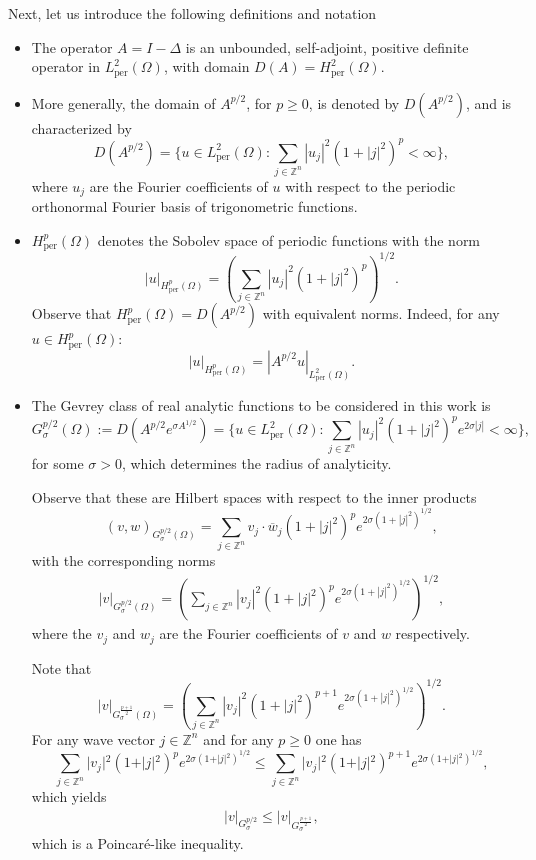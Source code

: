 \documentclass[12pt]{article}
\theoremstyle{plain}
\theoremstyle{remark}
\newcommand{\Hper}{H_{\mathrm{per}}}
\begin{document}
Next, let us introduce the following definitions and notation 
\begin{itemize}
\item  The operator $A=I-\Delta $ is an unbounded, self-adjoint, positive definite operator in $L_\text{per}^2(\Omega)$, with domain $D(A)=H_\text{per}^2(\Omega)$.
    
\item More generally, the domain of $A^{p/2}$, for $p\ge0$, is denoted by $D(A^{p/2})$,  and is characterized by 
\[D(A^{p/2})=\{u\in L_\text{per}^2(\Omega):\sum_{j\in \mathbb{Z}^{n}}|u_{j}|^{2}(1+|j|^{2})^{p}<\infty\},\]
    where $u_{j}$ are the Fourier coefficients of $u$ with respect to the periodic orthonormal Fourier basis of trigonometric functions.
    
\item  $\Hper^p(\Omega)$ denotes the  Sobolev space of periodic functions with the norm 
    \[|u|_{\Hper^p(\Omega)}=\left(\sum_{j\in \mathbb{Z}^{n}}|u_{j}|^{2}(1+|j|^{2})^{p}\right)^{1/2}.\]
    Observe that $\Hper^p(\Omega)=D(A^{p/2})$ with equivalent norms. Indeed, for any $u\in \Hper^p(\Omega)$:
    \[|u|_{\Hper^p(\Omega)}=|A^{p/2}u|_{L_\text{per}^2(\Omega)}.\]
    
    \item The Gevrey class of real analytic functions to be considered in this work is 
      \[G_{\sigma}^{p/2}(\Omega):=D(A^{p/2}e^{\sigma A^{1/2}})=\{u\in L_\text{per}^2(\Omega):\sum_{j\in \mathbb{Z}^{n}}|u_{j}|^{2}(1+|j|^{2})^{p}e^{2\sigma|j|}<\infty\},\] 
     for some $\sigma > 0$, which  determines the radius of analyticity.
      
Observe that these  are Hilbert spaces with respect to the inner products 
\[
(v,w)_{G_{\sigma}^{p/2}(\Omega)}=\sum_{j\in \mathbb{Z}^{n}}v_{j}\cdot\overline{w}_{j}(1+|j|^{2})^{p}e^{2\sigma(1+|j|^{2})^{1/2}}
,\]
with the corresponding norms 
\begin{align*}
    |v|_{G_{\sigma}^{p/2}(\Omega)}=\left(\sum_{j\in \mathbb{Z}^{n}}|v_{j}|^{2}(1+|j|^{2})^{p}e^{2\sigma(1+|j|^{2})^{1/2}}\right)^{1/2}, 
\end{align*}
where the $v_{j}$ and $w_{j}$ are the Fourier coefficients of $v$ and $w$ respectively. 

Note that \[|v|_{G_{\sigma}^{\frac{p+1}{2}}(\Omega)}=\left(\sum_{j\in \mathbb{Z}^{n}}|v_{j}|^{2}(1+|j|^{2})^{p+1}e^{2\sigma(1+|j|^{2})^{1/2}}\right)^{1/2}.\]
For any wave vector $j \in \mathbb{Z}^n$ and for any  $p\ge 0$ one has
$$\sum_{j\in \mathbb{Z}^{n}}\vert{}v_{j}\vert{}^{2}(1+\vert{}j\vert{}^{2})^{p}e^{2\sigma(1+\vert{}j\vert{}^{2})^{1/2}} \leq \sum_{j\in \mathbb{Z}^{n}}\vert{}v_{j}\vert{}^{2}(1+\vert{}j\vert{}^{2})^{p+1}e^{2\sigma(1+\vert{}j\vert{}^{2})^{1/2}},
$$
which yields
\begin{align}
    \vert{}v\vert{}_{G_\sigma^{p/2}} \leq \vert{}v\vert{}_{G_\sigma^{\frac{p+1}{2}}},\label {*}
\end{align}
which is a Poincar\'e-like inequality.


\end{itemize}
\end{document}
